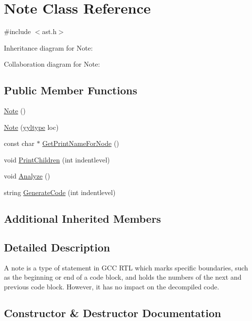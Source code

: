 \hypertarget{class_note}{}\section{Note Class Reference}
\label{class_note}


{\ttfamily \#include $<$ast.\+h$>$}



Inheritance diagram for Note\+:


Collaboration diagram for Note\+:
\subsection*{Public Member Functions}
\begin{DoxyCompactItemize}
\item 
\hyperlink{class_note_a11dfaf68eb7a094b121add4adb18620e}{Note} ()
\item 
\hyperlink{class_note_a3447549f2cbb503de5353cbcb848b37b}{Note} (\hyperlink{structyyltype}{yyltype} loc)
\item 
const char $\ast$ \hyperlink{class_note_ae38717d9af17947262aa3f4a1d473363}{Get\+Print\+Name\+For\+Node} ()
\item 
void \hyperlink{class_note_ae922da0a006d207db5e141dcade6032e}{Print\+Children} (int indentlevel)
\item 
void \hyperlink{class_note_a33934adfae6685ff299c6ee9a57fd1f5}{Analyze} ()
\item 
string \hyperlink{class_note_a1d4dec4a419c305cfb19376230365dc1}{Generate\+Code} (int indentlevel)
\end{DoxyCompactItemize}
\subsection*{Additional Inherited Members}


\subsection{Detailed Description}
A note is a type of statement in G\+CC R\+TL which marks specific boundaries, such as the beginning or end of a code block, and holds the numbers of the next and previous code block. However, it has no impact on the decompiled code. 

\subsection{Constructor \& Destructor Documentation}
\mbox{\label{class_note_a11dfaf68eb7a094b121add4adb18620e}} 
